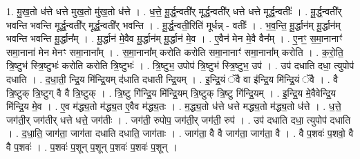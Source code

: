\documentclass[17pt]{extarticle}
\begin{document}
1. मु॒ख॒तो ध॑त्ते धत्ते मुख॒तो मु॑ख॒तो ध॑त्ते । . ध॒त्ते॒ मू॒र्द्ध॒न्वती᳚र् मूर्द्ध॒न्वती᳚र् धत्ते धत्ते मूर्द्ध॒न्वतीः᳚ । . मू॒र्द्ध॒न्वती᳚र् भवन्ति भवन्ति मूर्द्ध॒न्वती᳚र् मूर्द्ध॒न्वती᳚र् भवन्ति । . मू॒र्द्ध॒न्वती॒रिति॑ मूर्धन्न् - वतीः᳚ । . भ॒व॒न्ति॒ मू॒र्द्धान॑म् मू॒र्द्धान॑म् भवन्ति भवन्ति मू॒र्द्धान᳚म् । . मू॒र्द्धान॑ मे॒वैव मू॒र्द्धान॑म् मू॒र्द्धान॑ मे॒व । . ए॒वैन॑ मेन मे॒वै वैन᳚म् । . ए॒नꣳ॒॒ स॒मा॒नानाꣳ॑ समा॒नाना॑ मेन मेनꣳ समा॒नाना᳚म् । . स॒मा॒नाना᳚म् करोति करोति समा॒नानाꣳ॑ समा॒नाना᳚म् करोति । . क॒रो॒ति॒ त्रि॒ष्टुभ॑ स्त्रि॒ष्टुभः॑ करोति करोति त्रि॒ष्टुभः॑ । . त्रि॒ष्टुभ॒ उपोप॑ त्रि॒ष्टुभ॑ स्त्रि॒ष्टुभ॒ उप॑ । . उप॑ दधाति दधा॒ त्युपोप॑ दधाति । . द॒धा॒ती॒ न्द्रि॒य मि॑न्द्रि॒यम् द॑धाति दधाती न्द्रि॒यम् । . इ॒न्द्रि॒यं ॅवै वा इ॑न्द्रि॒य मि॑न्द्रि॒यं ॅवै । . वै त्रि॒ष्टुक् त्रि॒ष्टुग् वै वै त्रि॒ष्टुक् । . त्रि॒ष्टु गि॑न्द्रि॒य मि॑न्द्रि॒यम् त्रि॒ष्टुक् त्रि॒ष्टु गि॑न्द्रि॒यम् । . इ॒न्द्रि॒य मे॒वैवेन्द्रि॒य मि॑न्द्रि॒य मे॒व । . ए॒व म॑द्ध्य॒तो म॑द्ध्य॒त ए॒वैव म॑द्ध्य॒तः । . म॒द्ध्य॒तो ध॑त्ते धत्ते मद्ध्य॒तो म॑द्ध्य॒तो ध॑त्ते । . ध॒त्ते॒ जग॑ती॒र् जग॑तीर् धत्ते धत्ते॒ जग॑तीः । . जग॑ती॒ रुपोप॒ जग॑ती॒र् जग॑ती॒ रुप॑ । . उप॑ दधाति दधा॒ त्युपोप॑ दधाति । . द॒धा॒ति॒ जाग॑ता॒ जाग॑ता दधाति दधाति॒ जाग॑ताः । . जाग॑ता॒ वै वै जाग॑ता॒ जाग॑ता॒ वै । . वै प॒शवः॑ प॒शवो॒ वै वै प॒शवः॑ । . प॒शवः॑ प॒शून् प॒शून् प॒शवः॑ प॒शवः॑ प॒शून् । \newline
\end{document}
